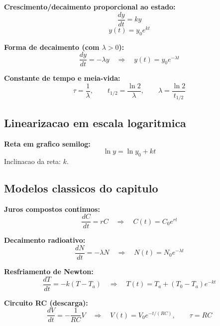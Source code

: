 \documentclass[12pt,a4paper]{article}
\begin{document}
\textbf{Crescimento/decaimento proporcional ao estado:}
\begin{equation}
\frac{dy}{dt} = ky
\end{equation}
\begin{equation}
y(t) = y_0 e^{kt}
\end{equation}

\textbf{Forma de decaimento (com $\lambda>0$):}
\begin{equation}
\frac{dy}{dt} = -\lambda y
\quad\Rightarrow\quad
y(t) = y_0 e^{-\lambda t}
\end{equation}

\textbf{Constante de tempo e meia-vida:}
\begin{equation}
\tau = \frac{1}{\lambda},
\qquad
t_{1/2} = \frac{\ln 2}{\lambda},
\qquad
\lambda = \frac{\ln 2}{t_{1/2}}
\end{equation}

\subsection*{Linearizacao em escala logaritmica}

\textbf{Reta em grafico semilog:}
\begin{equation}
\ln y = \ln y_0 + kt
\end{equation}
Inclinacao da reta: $k$.

\subsection*{Modelos classicos do capitulo}

\textbf{Juros compostos continuos:}
\begin{equation}
\frac{dC}{dt} = rC
\quad\Rightarrow\quad
C(t) = C_0 e^{rt}
\end{equation}

\textbf{Decaimento radioativo:}
\begin{equation}
\frac{dN}{dt} = -\lambda N
\quad\Rightarrow\quad
N(t) = N_0 e^{-\lambda t}
\end{equation}

\textbf{Resfriamento de Newton:}
\begin{equation}
\frac{dT}{dt} = -k(T-T_a)
\quad\Rightarrow\quad
T(t)=T_a + (T_0-T_a)e^{-kt}
\end{equation}

\textbf{Circuito RC (descarga):}
\begin{equation}
\frac{dV}{dt} = -\frac{1}{RC}V
\quad\Rightarrow\quad
V(t)=V_0 e^{-t/(RC)},
\qquad \tau = RC
\end{equation}
\end{document}
